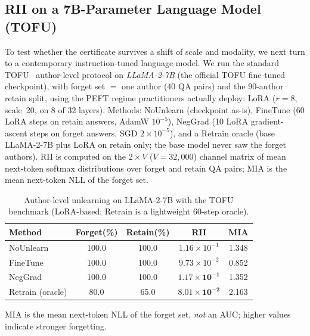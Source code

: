 \documentclass[smallextended]{svjour3}       %
\begin{document}
\subsection{RII on a 7B-Parameter Language Model (TOFU)}
\label{sec:llm}

To test whether the certificate survives a shift of scale and modality, we next turn to a contemporary instruction-tuned language model. We run the standard TOFU~\cite{maini2024tofu} author-level protocol on \emph{LLaMA-2-7B} (the official TOFU fine-tuned checkpoint), with forget set $=$ one author (40 QA pairs) and the 90-author retain split, using the PEFT regime practitioners actually deploy: LoRA ($r{=}8$, scale~20, on 8 of 32 layers). Methods: NoUnlearn (checkpoint as-is), FineTune (60 LoRA steps on retain answers, AdamW $10^{-5}$), NegGrad (10 LoRA gradient-ascent steps on forget answers, SGD $2{\times}10^{-5}$), and a Retrain oracle (base LLaMA-2-7B plus LoRA on retain only; the base model never saw the forget authors). RII is computed on the $2\times V$ ($V{=}32{,}000$) channel matrix of mean next-token softmax distributions over forget and retain QA pairs; MIA is the mean next-token NLL of the forget set.

\begin{table}[t]
\centering
\small
\caption{Author-level unlearning on LLaMA-2-7B with the TOFU benchmark (LoRA-based; Retrain is a lightweight 60-step oracle).}\label{tab:llm}
\setlength{\tabcolsep}{2pt}
\begin{tabular}{l c c c c}
\toprule
Method & Forget(\%) & Retain(\%) & RII & MIA \\
\midrule
NoUnlearn & 100.0 & 100.0 & $1.16{\times}10^{-1}$ & 1.348 \\
FineTune & 100.0 & 100.0 & $9.73{\times}10^{-2}$ & 0.852 \\
NegGrad & 100.0 & 100.0 & $\mathbf{1.17{\times}10^{-1}}$ & 1.352 \\
Retrain (oracle) & 80.0 & 65.0 & $\mathbf{8.01{\times}10^{-2}}$ & 2.163 \\
\bottomrule
\end{tabular}
\par\vspace{2pt}\footnotesize MIA is the mean next-token NLL of the forget set, \emph{not} an AUC; higher values indicate stronger forgetting.
\end{table}
\end{document}

